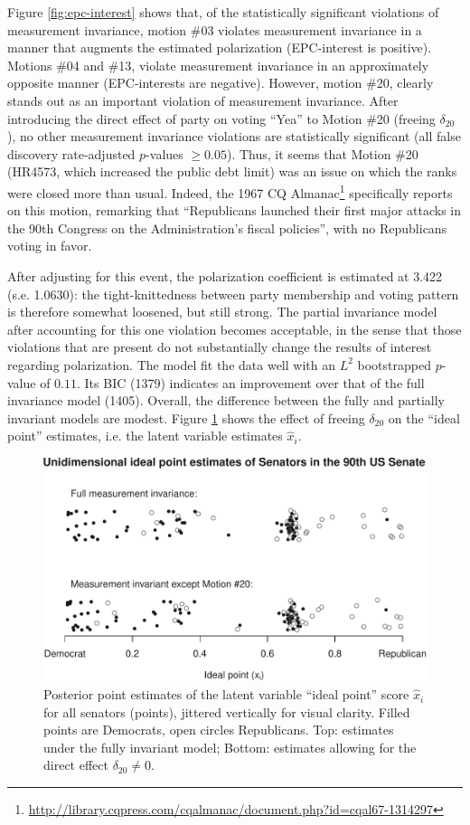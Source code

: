 \documentclass[letterpaper,12pt]{article}
\begin{document}
Figure \ref{fig:epc-interest} shows that, of the statistically significant violations of measurement invariance, motion \#03 violates measurement invariance in a manner that augments the estimated polarization (EPC-interest is positive). Motions \#04 and \#13, violate measurement invariance in an approximately opposite manner (EPC-interests are negative). However, motion \#20, clearly stands out as an important violation of measurement invariance.
After introducing the direct effect of party on voting ``Yea'' to Motion \#20 (freeing $\delta_{20}$), no other measurement invariance violations are statistically significant (all false discovery rate-adjusted $p$-values $\geq 0.05$). Thus, it seems that Motion \#20 (HR4573, which increased the public debt limit) was an issue on which the ranks were closed more than usual. Indeed, the 1967 CQ Almanac\footnote{\url{http://library.cqpress.com/cqalmanac/document.php?id=cqal67-1314297}} specifically reports on this motion, remarking that ``Republicans launched their first major attacks in the 90th Congress on the Administration's fiscal policies'', with no Republicans voting in favor. 

After adjusting for this event, the polarization coefficient is estimated at 3.422 (s.e. 1.0630): the tight-knittedness between party membership and voting pattern is therefore somewhat loosened, but still strong.  The partial invariance model after accounting for this one violation becomes acceptable, in  the sense that those violations that are present do not substantially change the results of interest regarding polarization. The model fit the data well with an $L^2$ bootstrapped $p$-value of $0.11$. Its BIC (1379) indicates an improvement over that of the full invariance model (1405).  Overall, the difference between the fully and partially invariant models are modest. Figure \ref{fig:ideal-points} shows the effect of freeing $\delta_{20}$ on the ``ideal point'' estimates, i.e. the latent variable estimates $\hat{x}_i$. 

\begin{figure}\centering
\includegraphics[width=.85\textwidth]{../outputs/ideal-points.pdf}
\caption{Posterior point estimates of the latent variable ``ideal point'' score $\hat{x}_i$ for all senators (points), jittered vertically for visual clarity. Filled points are Democrats, open circles Republicans. Top: estimates under the fully invariant model; Bottom: estimates allowing for the direct effect $\delta_{20}\neq0$.}
\label{fig:ideal-points}
\end{figure}
\end{document}

